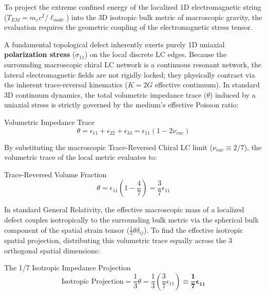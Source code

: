 To project the extreme confined energy of the localized 1D electromagnetic string ($T_{EM}=m_{e}c^{2}/\ell_{node}$) into the 3D isotropic bulk metric of macroscopic gravity, the evaluation requires the geometric coupling of the electromagnetic stress tensor.

A fundamental topological defect inherently exerts purely 1D uniaxial \textbf{polarization stress} ($\sigma_{11}$) on the local discrete LC edges. Because the surrounding macroscopic chiral LC network is a continuous resonant network, the lateral electromagnetic fields are not rigidly locked; they physically contract via the inherent trace-reversal kinematics ($K=2G$ effective continuum). In standard 3D continuum dynamics, the total volumetric impedance trace ($\theta$) induced by a uniaxial stress is strictly governed by the medium's effective Poisson ratio:

\begin{resultbox}{Volumetric Impedance Trace}
\begin{equation}
\theta=\epsilon_{11}+\epsilon_{22}+\epsilon_{33}=\epsilon_{11}(1-2\nu_{vac})
\end{equation}
\end{resultbox}

By substituting the macroscopic Trace-Reversed Chiral LC limit ($\nu_{vac}\equiv2/7$), the volumetric trace of the local metric evaluates to:

\begin{resultbox}{Trace-Reversed Volume Fraction}
\begin{equation}
\theta=\epsilon_{11}\left(1-\frac{4}{7}\right)=\frac{3}{7}\epsilon_{11}
\end{equation}
\end{resultbox}

In standard General Relativity, the effective macroscopic mass of a localized defect couples isotropically to the surrounding bulk metric via the spherical bulk component of the spatial strain tensor ($\frac{1}{3}\theta\delta_{ij}$). To find the effective isotropic spatial projection, distributing this volumetric trace equally across the 3 orthogonal spatial dimensions:

\begin{resultbox}{The 1/7 Isotropic Impedance Projection}
\begin{equation}
\text{Isotropic Projection} = \frac{1}{3}\theta = \frac{1}{3}\left(\frac{3}{7}\epsilon_{11}\right) \equiv \mathbf{\frac{1}{7}\epsilon_{11}}
\end{equation}
\end{resultbox}

